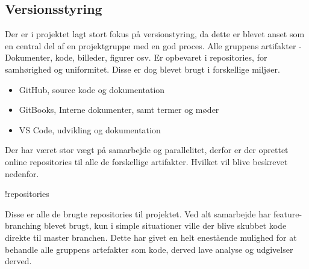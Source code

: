 \subsection{Versionsstyring}

Der er i projektet lagt stort fokus på versionstyring, da dette er blevet anset som en central del af en projektgruppe med en god proces. Alle gruppens artifakter - Dokumenter, kode, billeder, figurer osv. Er opbevaret i repositories, for samhørighed og uniformitet. Disse er dog blevet brugt i forskellige miljøer.

\begin{itemize}
    \item GitHub, source kode og dokumentation
    \item GitBooks, Interne dokumenter, samt termer og møder
    \item VS Code, udvikling og dokumentation
\end{itemize}

Der har været stor vægt på samarbejde og parallelitet, derfor er der oprettet online repositories til alle de forskellige artifakter. Hvilket vil blive beskrevet nedenfor.

{!repositories}

Disse er alle de brugte repositories til projektet. Ved alt samarbejde har feature-branching blevet brugt, kun i simple situationer ville der blive skubbet kode direkte til master branchen. Dette har givet en helt enestående mulighed for at behandle alle gruppens artefakter som kode, derved lave analyse og udgivelser derved.